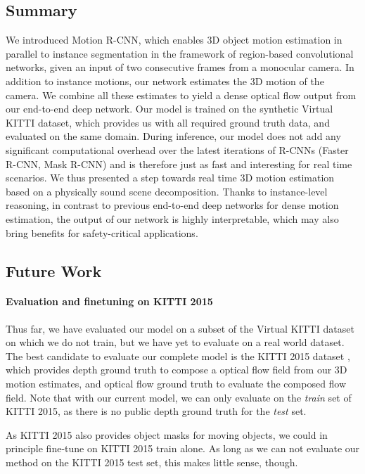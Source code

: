 \subsection{Summary}

We introduced Motion R-CNN, which enables 3D object motion estimation in parallel
to instance segmentation in the framework of region-based convolutional networks,
given an input of two consecutive frames from a monocular camera.
In addition to instance motions, our network estimates the 3D motion of the camera.
We combine all these estimates to yield a dense optical flow output from our
end-to-end deep network.
Our model is trained on the synthetic Virtual KITTI dataset, which provides
us with all required ground truth data, and evaluated on the same domain.
During inference, our model does not add any significant computational overhead
over the latest iterations of R-CNNs (Faster R-CNN, Mask R-CNN) and is therefore just as fast and interesting
for real time scenarios.
We thus presented a step towards real time 3D motion estimation based on a
physically sound scene decomposition. Thanks to instance-level reasoning, in contrast
to previous end-to-end deep networks for dense motion estimation, the output
of our network is highly interpretable, which may also bring benefits for safety-critical
applications.

\subsection{Future Work}
\paragraph{Evaluation and finetuning on KITTI 2015}
Thus far, we have evaluated our model on a subset of the Virtual KITTI dataset
on which we do not train, but we have yet to evaluate on a real world dataset.
The best candidate to evaluate our complete model is the KITTI 2015 dataset \cite{KITTI2015},
which provides depth ground truth to compose a optical flow field from our 3D motion estimates,
and optical flow ground truth to evaluate the composed flow field.
Note that with our current model, we can only evaluate on the \emph{train} set
of KITTI 2015, as there is no public depth ground truth for the \emph{test} set.

As KITTI 2015 also provides object masks for moving objects, we could in principle
fine-tune on KITTI 2015 train alone. As long as we can not evaluate our method on the
KITTI 2015 test set, this makes little sense, though.

